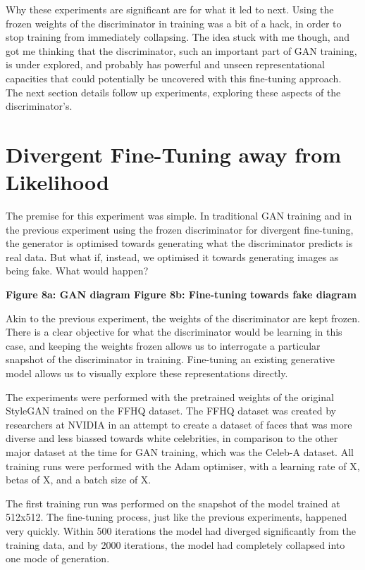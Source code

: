 Why these experiments are significant are for what it led to next. Using the frozen weights of the discriminator in training was a bit of a hack, in order to stop training from immediately collapsing. 
The idea stuck with me though, and got me thinking that the discriminator, such an important part of GAN training, is under explored, and probably has powerful and unseen representational capacities that could potentially be uncovered with this fine-tuning approach. 
The next section details follow up experiments, exploring these aspects of the discriminator's.

\section{Divergent Fine-Tuning away from Likelihood}

The premise for this experiment was simple. In traditional GAN training and in the previous experiment using the frozen discriminator for divergent fine-tuning, the generator is optimised towards generating what the discriminator predicts is real data. 
But what if, instead, we optimised it towards generating images as being fake. What would happen?

\textbf{Figure 8a: GAN diagram 
Figure 8b: Fine-tuning towards fake diagram}

Akin to the previous experiment, the weights of the discriminator are kept frozen. 
There is a clear objective for what the discriminator would be learning in this case, and keeping the weights frozen allows us to interrogate a particular snapshot of the discriminator in training. 
Fine-tuning an existing generative model allows us to visually explore these representations directly.

The experiments were performed with the pretrained weights of the original StyleGAN trained on the FFHQ dataset. 
The FFHQ dataset was created by researchers at NVIDIA in an attempt to create a dataset of faces that was more diverse and less biassed towards white celebrities, in comparison to the other major dataset at the time for GAN training, which was the Celeb-A dataset. 
All training runs were performed with the Adam optimiser, with a learning rate of X, betas of X, and a batch size of X.

The first training run was performed on the snapshot of the model trained at 512x512. 
The fine-tuning process, just like the previous experiments, happened very quickly. 
Within 500 iterations the model had diverged significantly from the training data, and by 2000 iterations, the model had completely collapsed into one mode of generation. 

